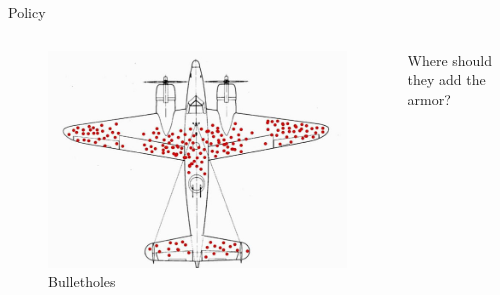 \documentclass[
  ignorenonframetext,
]{beamer}
\renewcommand{\,}{\text{, }}
\begin{document}
\begin{frame}{Policy}
\protect\hypertarget{policy}{}
\begin{columns}[c]
\begin{column}{0.48\textwidth}
\begin{figure}
\centering
\includegraphics{../images/week10/wald_plane.jpg}
\caption{Bulletholes}
\end{figure}
\end{column}

\begin{column}{0.48\textwidth}
Where should they add the armor?
\end{column}
\end{columns}
\end{frame}
\end{document}

